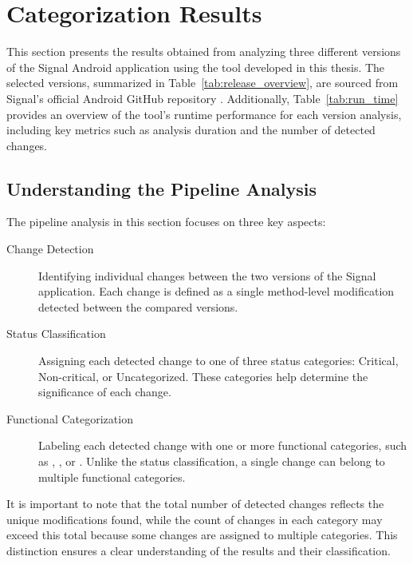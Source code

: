 \newpage

\section{Categorization Results}
\label{sec:res:categorization:result}
This section presents the results obtained from analyzing three different versions of the Signal Android application using the tool developed in this thesis. The selected versions, summarized in Table~\ref{tab:release_overview}, are sourced from Signal's official Android GitHub repository \cite{githubSignal}. Additionally, Table~\ref{tab:run_time} provides an overview of the tool’s runtime performance for each version analysis, including key metrics such as analysis duration and the number of detected changes.


\subsection{Understanding the Pipeline Analysis}
The pipeline analysis in this section focuses on three key aspects:

\begin{description}
    \item[Change Detection] Identifying individual changes between the two versions of the Signal application. Each change is defined as a single method-level modification detected between the compared versions.

    \item[Status Classification] Assigning each detected change to one of three status categories: Critical, Non-critical, or Uncategorized. These categories help determine the significance of each change.

    \item[Functional Categorization] Labeling each detected change with one or more functional categories, such as , , or . Unlike the status classification, a single change can belong to multiple functional categories.
\end{description}

It is important to note that the total number of detected changes reflects the unique modifications found, while the count of changes in each category may exceed this total because some changes are assigned to multiple categories. This distinction ensures a clear understanding of the results and their classification.

